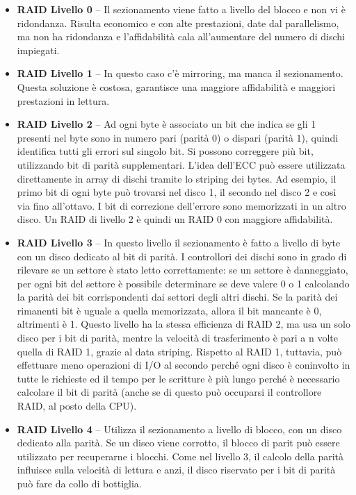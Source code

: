 \documentclass[a4paper]{article}
\begin{document}
\begin{itemize}
    \item \textbf{RAID Livello 0} -- Il sezionamento viene fatto a livello del blocco e non vi è ridondanza. Risulta economico e con alte prestazioni, date dal parallelismo, ma non ha ridondanza e l'affidabilità cala all'aumentare del numero di dischi impiegati.
    \item \textbf{RAID Livello 1} -- In questo caso c'è mirroring, ma manca il sezionamento. Questa soluzione è costosa, garantisce una maggiore affidabilità e maggiori prestazioni in lettura.
    \item \textbf{RAID Livello 2} -- Ad ogni byte è associato un bit che indica se gli 1 presenti nel byte sono in numero pari (parità 0) o dispari (parità 1), quindi identifica tutti gli errori sul singolo bit. Si possono correggere più bit, utilizzando bit di parità supplementari. L'idea dell'ECC può essere utilizzata direttamente in array di dischi tramite lo striping dei bytes. Ad esempio, il primo bit di ogni byte può trovarsi nel disco 1, il secondo nel disco 2 e così via fino all'ottavo. I bit di correzione dell'errore sono memorizzati in un altro disco. Un RAID di livello 2 è quindi un RAID 0 con maggiore affidabilità.
    \item \textbf{RAID Livello 3} -- In questo livello il sezionamento è fatto a livello di byte con un disco dedicato al bit di parità. I controllori dei dischi sono in grado di rilevare se un settore è stato letto correttamente: se un settore è danneggiato, per ogni bit del settore è possibile determinare se deve valere 0 o 1 calcolando la parità dei bit corrispondenti dai settori degli altri dischi. Se la parità dei rimanenti bit è uguale a quella memorizzata, allora il bit mancante è 0, altrimenti è 1. Questo livello ha la stessa efficienza di RAID 2, ma usa un solo disco per i bit di parità, mentre la velocità di trasferimento è pari a n volte quella di RAID 1, grazie al data striping. Rispetto al RAID 1, tuttavia, può effettuare meno operazioni di I/O al secondo perché ogni disco è coninvolto in tutte le richieste ed il tempo per le scritture è più lungo perché è necessario calcolare il bit di parità (anche se di questo può occuparsi il controllore RAID, al posto della CPU).
    \item \textbf{RAID Livello 4} -- Utilizza il sezionamento a livello di blocco, con un disco dedicato alla parità. Se un disco viene corrotto, il blocco di parit può essere utilizzato per recuperarne i blocchi. Come nel livello 3, il calcolo della parità influisce sulla velocità di lettura e anzi, il disco riservato per i bit di parità può fare da collo di bottiglia.

\end{itemize}
\end{document}
